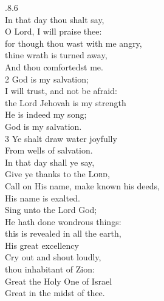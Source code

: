 \documentclass{article}
\begin{document}
\begin{multicols}{2}
.8.6\\


 In that day thou shalt say,\\
O Lord, I will praise thee:\\
for though thou wast with me angry,\\ 
thine wrath is turned away,\\
 
\noindent And thou comfortedst me.\\
2 God is my salvation; \\
I will trust, and not be afraid:\\
the Lord Jehovah is my strength\\

\noindent He is indeed my song;\\ 
God is my salvation.\\
3 Ye shalt draw water joyfully\\ 
From wells of salvation.\\

 In that day shall ye say,\\ 
Give ye thanks to the \textsc{Lord},\\ 
Call on His name, make known his deeds,\\
His name is exalted.\\

 Sing unto the Lord God;\\
He hath done wondrous things:\\
this is revealed in all the earth,\\
His great excellency\\

 Cry out and shout loudly,\\
thou inhabitant of Zion:\\
Great the Holy One of Israel\\
Great in the midst of thee.\\

\end{multicols}
\end{document}

